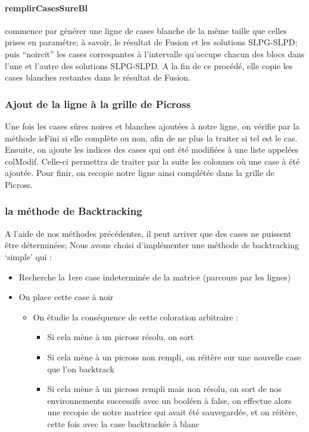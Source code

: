 \documentclass{article}
\begin{document}
\paragraph{remplirCasesSureBl} commence par g\'en\'erer une ligne de cases blanche de la m\^eme taille que celles prises en param\'etre; \`a savoir, le r\'esultat de Fusion et les solutions SLPG-SLPD; puis ``noircit'' les cases correspantes \`a l'intervalle qu'occupe chacun des blocs dans l'une et l'autre des solutions SLPG-SLPD.
\newline
A la fin de ce proc\'ed\'e, elle copie les cases blanches restantes dans le r\'esultat de Fusion.
\subsubsection{Ajout de la ligne \`a la grille de Picross}
Une fois les cases s\^ures noires et blanches ajout\'ees \`a notre ligne, on v\'erifie par la m\'ethode isFini si elle compl\`ete ou non, afin de ne plus la traiter si tel est le cas.
\newline
Ensuite, on ajoute les indices des cases qui ont \'et\'e modifi\'ees \`a une liste appel\'ees colModif. Celle-ci permettra de traiter par la suite les colonnes o\`u une case \`a \'et\'e ajout\'ee.
\newline
Pour finir, on recopie notre ligne ainsi compl\'et\'ee dans la grille de Picross.

\subsubsection{la méthode de Backtracking}
A l'aide de nos méthodes précédentes, il peut arriver que des cases ne puissent être déterminées;\newline
Nous avons choisi d'implémenter une méthode de backtracking `simple' qui : 
\begin{itemize}
\item Recherche la 1ere case indeterminée de la matrice (parcours par les lignes)
\item On place cette case à noir
\begin{itemize}
\item On étudie la conséquence de cette coloration arbitraire : 
\begin{itemize}
\item Si cela mène à un picross résolu, on sort
\item Si cela mène à un picross non rempli, on réitère sur une nouvelle case que l'on backtrack
\item Si cela mène à un picross rempli mais non résolu, on sort de nos environnements successifs avec un booléen à false, on effectue alors une recopie de notre matrice qui avait été sauvegardée, et on réitère, cette fois avec la case backtrackée à blanc
\end{itemize}
\end{itemize}
\end{itemize}
\end{document}
